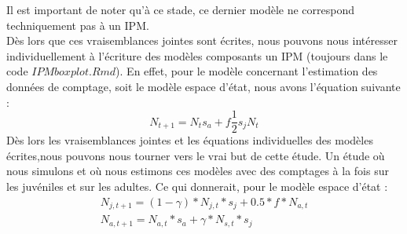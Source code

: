 \documentclass[12pt,a4paper]{article}
\begin{document}
Il est important de noter qu'à ce stade, ce dernier modèle ne correspond techniquement pas à un IPM.\\
Dès lors que ces vraisemblances jointes sont écrites, nous pouvons nous intéresser individuellement à l'écriture des modèles composants un IPM (toujours dans le code $IPMboxplot.Rmd$). En effet, pour le modèle concernant l'estimation des données de comptage, soit le modèle espace d'état, nous avons l'équation suivante : 
\begin{equation}
N_{t+1}=N_{t}s_{a}+f\dfrac{1}{2}s_{j}N_t
\end{equation}
Dès lors les vraisemblances jointes et les équations individuelles des modèles écrites,nous pouvons nous tourner vers le vrai but de cette étude. Un étude où nous simulons et où nous estimons ces modèles avec des comptages à la fois sur les juvéniles et sur les adultes.
Ce qui donnerait, pour le modèle espace d'état : 
\begin{equation}
\begin{aligned}
   N_{j, t+1} = (1-\gamma)*N_{j, t}*s_{j}+0.5*f*N_{a, t}\\
   N_{a, t+1} = N_{a, t}*s_{a}+ \gamma *N_{s, t}*s_j
\end{aligned}
\end{equation}
\end{document}

